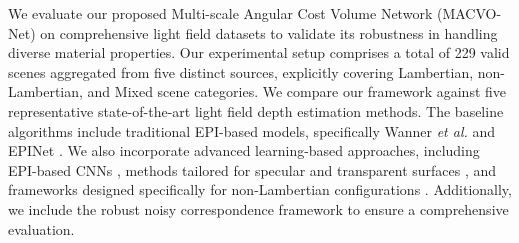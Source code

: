 \documentclass[lettersize,journal]{IEEEtran}
\begin{document}
\begin{table}[htbp]
  \centering
  \caption{Summary of Key Implementation Hyperparameters.}
  \label{tab:hyperparam}
\end{table}

We evaluate our proposed Multi-scale Angular Cost Volume Network (MACVO-Net) on comprehensive light field datasets to validate its robustness in handling diverse material properties. Our experimental setup comprises a total of 229 valid scenes aggregated from five distinct sources, explicitly covering Lambertian, non-Lambertian, and Mixed scene categories. We compare our framework against five representative state-of-the-art light field depth estimation methods. The baseline algorithms include traditional EPI-based models, specifically Wanner \textit{et al.} \cite{wanner2014} and EPINet \cite{heber2018}. We also incorporate advanced learning-based approaches, including EPI-based CNNs \cite{lyu2022}, methods tailored for specular and transparent surfaces \cite{zhang2023}, and frameworks designed specifically for non-Lambertian configurations \cite{li2021}. Additionally, we include the robust noisy correspondence framework \cite{wang2023} to ensure a comprehensive evaluation.
\end{document}
